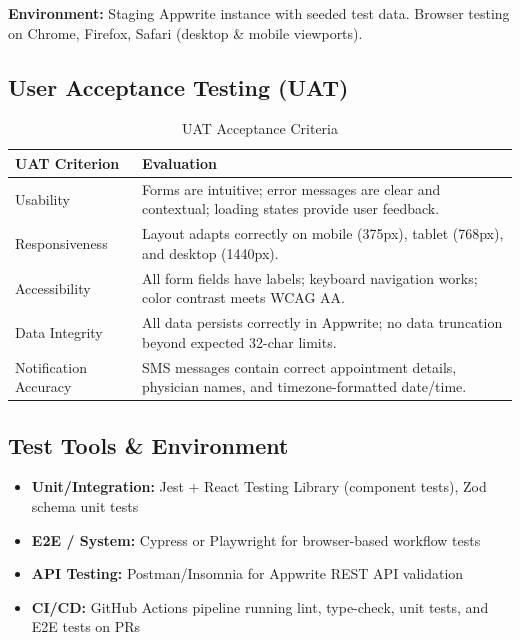\documentclass[11pt,a4paper]{article}
\begin{document}
\textbf{Environment:} Staging Appwrite instance with seeded test data. Browser testing on Chrome, Firefox, Safari (desktop \& mobile viewports).

\subsection{User Acceptance Testing (UAT)}

\begin{table}[H]
\centering
\caption{UAT Acceptance Criteria}
\begin{tabular}{|p{3.2cm}|p{10cm}|}
\hline
\textbf{UAT Criterion} & \textbf{Evaluation} \\
\hline
Usability & Forms are intuitive; error messages are clear and contextual; loading states provide user feedback. \\
\hline
Responsiveness & Layout adapts correctly on mobile (375px), tablet (768px), and desktop (1440px). \\
\hline
Accessibility & All form fields have labels; keyboard navigation works; color contrast meets WCAG AA. \\
\hline
Data Integrity & All data persists correctly in Appwrite; no data truncation beyond expected 32-char limits. \\
\hline
Notification Accuracy & SMS messages contain correct appointment details, physician names, and timezone-formatted date/time. \\
\hline
\end{tabular}
\end{table}

\subsection{Test Tools \& Environment}

\begin{itemize}
    \item \textbf{Unit/Integration:} Jest + React Testing Library (component tests), Zod schema unit tests
    \item \textbf{E2E / System:} Cypress or Playwright for browser-based workflow tests
    \item \textbf{API Testing:} Postman/Insomnia for Appwrite REST API validation
    \item \textbf{CI/CD:} GitHub Actions pipeline running lint, type-check, unit tests, and E2E tests on PRs
\end{itemize}

\newpage
\end{document}
